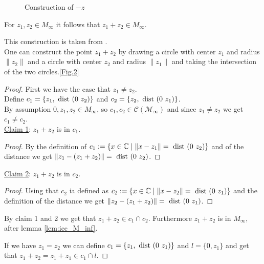 \begin{figure}[h!]
    \centering
    \caption{Construction of $-z$}
    \label{Fig.1}
\end{figure}

\begin{lemma}
    \label{lem:construction_add}
    \leanok
    For $z_1, z_2 \in M_{\infty}$ it follows that $z_1 + z_2 \in M_{\infty}$.
\end{lemma}
This construction is taken from \cite{JAN_SCHRÖER:2023}.\\
One can construct the point $z_1 + z_2$ by drawing a circle with center $z_1$ and radius $\|z_2\|$ and a circle with center $z_2$ and radius $\|z_1\|$ and taking the intersection of the two circles.\ref{Fig.2}
\begin{proof}
    \leanok
    First we have the case that $z_1 \ne z_2$.\\
    Define $c_1 = \{z_1,\text{ dist } (0\ z_2)\}$ and $c_2 = \{z_2,\dist (0\ z_1)\}$.\\
    By assumption $0, z_1, z_2 \in M_{\infty}$, so $c_1, c_2 \in \mathcal{C(M_{\infty})}$ and since $z_1 \ne z_2$ we get $c_1 \ne c_2$.\\
    \underline{Claim 1}: $z_1 + z_2$ is in $c_1$.
    \begin{proof}
        By the definition of $c_1:=\{x\in\mathbb{C} \mid\|x-z_1\|=\dist (0\ z_2)\}$
        and of the distance we get $\|z_1-(z_1+z_2)\| = \text{ dist } (0\ z_2)$.
    \end{proof}
    \underline{Claim 2}: $z_1 + z_2$ is in $c_2$.
    \begin{proof}
        Using that  $c_2$ ia defined as $c_2:=\{x\in\mathbb{C} \mid\|x-z_2\|=\text{ dist } (0\ z_1)\}$ and the definition of the distance we get $\|z_2-(z_1+z_2)\| = \dist (0\ z_1)$.
    \end{proof}
    By claim 1 and 2 we get that $z_1 + z_2 \in c_1 \cap c_2$. Furthermore  $z_1 + z_2 $ is in $M_{\infty}$, after lemma \ref{lem:icc_M_inf}.
    
    If we have $z_1 = z_2$ we can define $c_1 = \{z_1,\dist (0\ z_1)\}$ and $l = \{0,z_1\}$ and get that $z_1 + z_2 = z_1 + z_1 \in c_1 \cap l$.

\end{proof}
